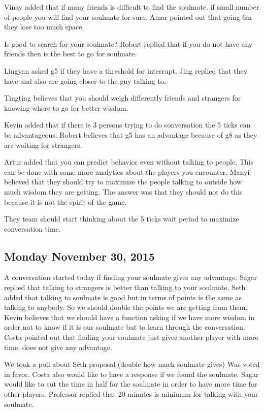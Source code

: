 Vinay added that if many friends is difficult to find the soulmate. if small number of people you will find your soulmate for sure.
Amar pointed out that going 6m they lose too much space.

Is good to search for your soulmate?
Robert replied that if you do not have any friends then is the best to go for soulmate.

Lingyan asked g5 if they have a threshold for interrupt.
Jing replied that they have and also are going closer to the guy talking to.

Tingting believes that you should weigh differently friends and strangers for knowing where to go for better wisdom.

Kevin added that if there is 3 persons trying to do conversation the 5 ticks can be advantageous.
Robert believes that g5 has an advantage because of g8 as they are waiting for strangers.

Artur added that you can predict behavior even without talking to people. This can be done with some more analytics about the players you encounter.
Manyi believed that they should try to maximize the people talking to outside how much wisdom they are getting. The answer was that they should not do this because it is not the spirit of the game.

They team should start thinking about the 5 ticks wait period to maximize conversation time.

\subsection{Monday November 30, 2015}
A conversation started today if finding your soulmate gives any advantage.
Sagar replied that talking to strangers is better than talking to your soulmate.
Seth added that talking to soulmate is good but in terms of points is the same as talking to anybody. So we should double the points we are getting from them.
Kevin believes that we should have a function asking if we have more wisdom in order not to know if it is our soulmate but to learn through the conversation.
Costa pointed out that finding your soulmate just gives another player with more time. does not give any advantage.

We took a poll about Seth proposal (double how much soulmate gives)
Was voted in favor.
Costa also would like to have a response if we found the soulmate.
Sagar would like to cut the time in half for the soulmate in order to have more 
time for other players.
Professor replied that 20 minutes is minimum for talking with your soulmate.

